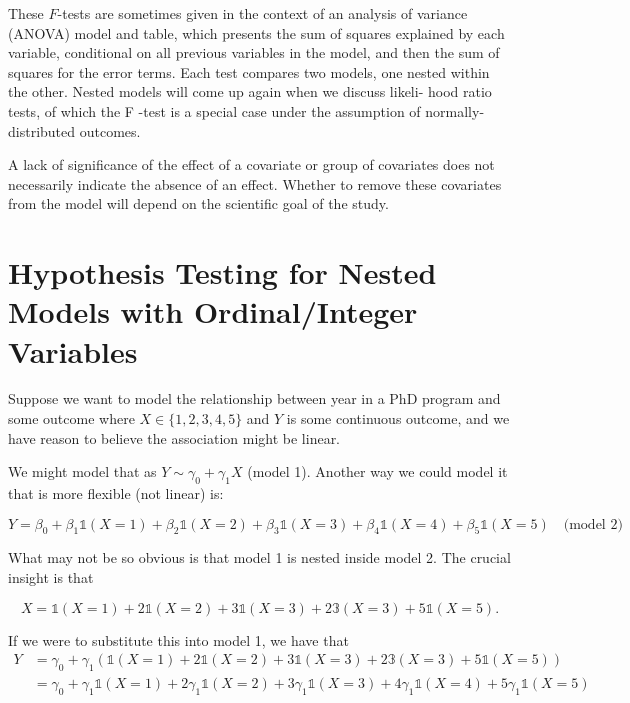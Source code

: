 \documentclass[
  letterpaper,
  DIV=11,
  numbers=noendperiod]{scrreport}
\begin{document}
These \(F\)-tests are sometimes given in the context of an analysis of
variance (ANOVA) model and table, which presents the sum of squares
explained by each variable, conditional on all previous variables in the
model, and then the sum of squares for the error terms. Each test
compares two models, one nested within the other. Nested models will
come up again when we discuss likeli- hood ratio tests, of which the F
-test is a special case under the assumption of normally-distributed
outcomes.

A lack of significance of the effect of a covariate or group of
covariates does not necessarily indicate the absence of an effect.
Whether to remove these covariates from the model will depend on the
scientific goal of the study.

\hypertarget{hypothesis-testing-for-nested-models-with-ordinalinteger-variables}{%
\section{Hypothesis Testing for Nested Models with Ordinal/Integer
Variables}\label{hypothesis-testing-for-nested-models-with-ordinalinteger-variables}}

Suppose we want to model the relationship between year in a PhD program
and some outcome where \(X \in \{ 1, 2, 3, 4, 5 \}\) and \(Y\) is some
continuous outcome, and we have reason to believe the association might
be linear.

We might model that as \(Y \sim \gamma_0 + \gamma_1 X\) (model 1).
Another way we could model it that is more flexible (not linear) is:

\[Y = \beta_0 + \beta_1 \mathbb 1(X = 1) + \beta_2 \mathbb 1(X=2)  + \beta_3 \mathbb 1(X=3)  + \beta_4 \mathbb 1(X=4)  + \beta_5 \mathbb 1(X=5) \quad \text{(model 2)}\]

What may not be so obvious is that model 1 is nested inside model 2. The
crucial insight is that

\[X = \mathbb 1(X = 1) + 2 \mathbb 1(X=2) + 3 \mathbb 1(X=3) +2 \mathbb 3(X=3) +5 \mathbb 1(X=5).\]

If we were to substitute this into model 1, we have that
\[\begin{aligned} Y & = \gamma_0 + \gamma_1 (\mathbb 1(X = 1) + 2 \mathbb 1(X=2) + 3 \mathbb 1(X=3) +2 \mathbb 3(X=3) +5 \mathbb 1(X=5)) \\ 
& = \gamma_0 + \gamma_1 \mathbb 1(X = 1) + 2 \gamma_1 \mathbb 1(X=2) + 3 \gamma_1 \mathbb 1(X=3) + 4 \gamma_1 \mathbb 1(X=4) +5 \gamma_1 \mathbb 1(X=5) 
\end{aligned}\]
\end{document}
